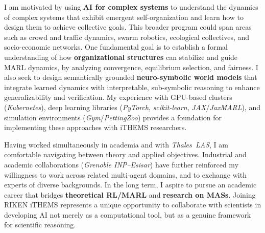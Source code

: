 \documentclass[11pt,a4paper,sans]{moderncv}
\begin{document}
I am motivated by using \textbf{AI for complex systems} to understand the dynamics of complex systems that exhibit emergent self-organization and learn how to design them to achieve collective goals. This broader program could span areas such as crowd and traffic dynamics, swarm robotics, ecological collectives, and socio-economic networks. One fundamental goal is to establish a formal understanding of how \textbf{organizational structures} can stabilize and guide MARL dynamics, by analyzing convergence, equilibrium selection, and fairness. I also seek to design semantically grounded \textbf{neuro-symbolic world models} that integrate learned dynamics with interpretable, sub-symbolic reasoning to enhance generalizability and verification. My experience with GPU-based clusters (\textit{Kubernetes}), deep learning libraries (\textit{PyTorch}, \textit{scikit-learn}, \textit{JAX}/\textit{JaxMARL}), and simulation environments (\textit{Gym}/\textit{PettingZoo}) provides a foundation for implementing these approaches with iTHEMS researchers.

Having worked simultaneously in academia and with \textit{Thales~LAS}, I am comfortable navigating between theory and applied objectives. Industrial and academic collaborations (\textit{Grenoble INP--Esisar}) have further reinforced my willingness to work across related multi-agent domains, and to exchange with experts of diverse backgrounds.
%
In the long term, I aspire to pursue an academic career that bridges \textbf{theoretical RL/MARL} and \textbf{research on MASs}. Joining RIKEN iTHEMS represents a unique opportunity to collaborate with scientists in developing AI not merely as a computational tool, but as a genuine framework for scientific reasoning.



\makeletterclosing
\end{document}
